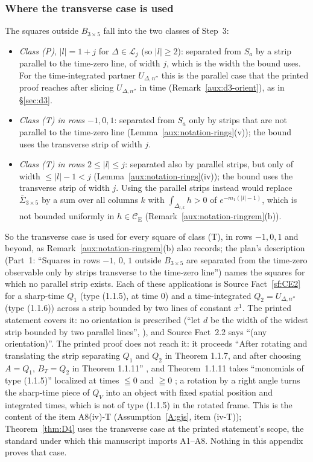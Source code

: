 \documentclass[11pt,a4paper]{article}
\theoremstyle{plain}
\theoremstyle{definition}
\theoremstyle{plain}
\theoremstyle{definition}
\newcommand{\CE}{\mathcal{C}_{\mathrm E}}
\begin{document}
\subsubsection{Where the transverse case is used}\label{sub:d4-transverse}

The squares outside $B_{3\times5}$ fall into the two classes of Step~3:
\begin{itemize}
\item \emph{Class (P)}, $|l|=1+j$ for $\Delta\in\mathcal L_j$ (so $|l|\ge2$): separated from $S_a$
by a strip parallel to the time-zero line, of width $j$, which is the width the bound uses.  For
the time-integrated partner $U_{\Delta,n''}$ this is the parallel case that the printed proof
reaches after slicing $U_{\Delta,n''}$ in time (Remark~\ref{aux:d3-orient}), as in \S\ref{sec:d3}.
\item \emph{Class (T) in rows $-1,0,1$}: separated from $S_a$ only by strips that are not
parallel to the time-zero line (Lemma~\ref{aux:notation-rings}(v)); the bound uses the transverse
strip of width $j$.
\item \emph{Class (T) in rows $2\le|l|\le j$}: separated also by parallel strips, but only of width
$\le|l|-1<j$ (Lemma~\ref{aux:notation-rings}(iv)); the bound uses the transverse strip of width
$j$.  Using the parallel strips instead would replace $\overline\Sigma_{3\times5}$ by a sum over
all columns $k$ with $\int_{\Delta_{l,k}}h>0$ of $e^{-m_1(|l|-1)}$, which is not bounded uniformly
in $h\in\CE$ (Remark~\ref{aux:notation-ringrem}(b)).
\end{itemize}
So the transverse case is used for every square of class (T), in rows $-1,0,1$ and beyond, as
Remark~\ref{aux:notation-ringrem}(b) also records; the plan's description (Part~1: ``Squares in rows
$-1$, $0$, $1$ outside $B_{3\times5}$ are separated from the time-zero observable only by strips
transverse to the time-zero line'') names the squares for which no parallel strip exists.  Each of
these applications is Source Fact~\ref{sf:CE2} for a sharp-time $Q_1$ (type (1.1.5), at time $0$) and a
time-integrated $Q_2=U_{\Delta,n''}$ (type (1.1.6)) across a strip bounded by two lines of constant
$x^1$.  The printed statement covers it: no orientation is prescribed (``let $d$ be the width of
the widest strip bounded by two parallel lines'', \cite[p.~594]{GJS}), and Source Fact~2.2 says ``(any orientation)''.  The printed proof does not reach it: it proceeds ``After
rotating and translating the strip separating $Q_1$ and $Q_2$ in Theorem 1.1.7, and after choosing
$A=Q_1$, $B_T=Q_2$ in Theorem 1.1.11'' \cite[p.~597]{GJS}, and Theorem~1.1.11 takes ``monomials of
type (1.1.5)'' localized at times $\leqq0$ and $\geqq0$ \cite[p.~596]{GJS}; a rotation by a right
angle turns the sharp-time piece of $Q_V$ into an object with fixed spatial position and integrated
times, which is not of type (1.1.5) in the rotated frame.  This is the content of the item A8(iv)-T
(Assumption~\ref{A:gjs}, item (iv-T)); Theorem~\ref{thm:D4} uses the transverse case at the printed statement's
scope, the standard under which this manuscript imports A1--A8.  Nothing in this appendix proves that case.
\end{document}
